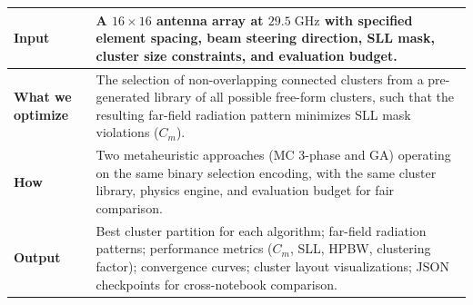 \documentclass[11pt,a4paper]{article}
\begin{document}
\begin{center}
\renewcommand{\arraystretch}{1.3}
\begin{tabular}{p{2.5cm} p{10.5cm}}
\toprule
\textbf{Input} & A $16 \times 16$ antenna array at $29.5\;\text{GHz}$ with specified
element spacing, beam steering direction, SLL mask, cluster size constraints,
and evaluation budget. \\
\midrule
\textbf{What we optimize} & The selection of non-overlapping connected clusters from
a pre-generated library of all possible free-form clusters, such that the
resulting far-field radiation pattern minimizes SLL mask violations ($C_m$). \\
\midrule
\textbf{How} & Two metaheuristic approaches (MC 3-phase and GA) operating on the same
binary selection encoding, with the same cluster library, physics engine,
and evaluation budget for fair comparison. \\
\midrule
\textbf{Output} & Best cluster partition for each algorithm; far-field radiation patterns;
performance metrics ($C_m$, SLL, HPBW, clustering factor); convergence curves;
cluster layout visualizations; JSON checkpoints for cross-notebook comparison. \\
\bottomrule
\end{tabular}
\end{center}
\end{document}
